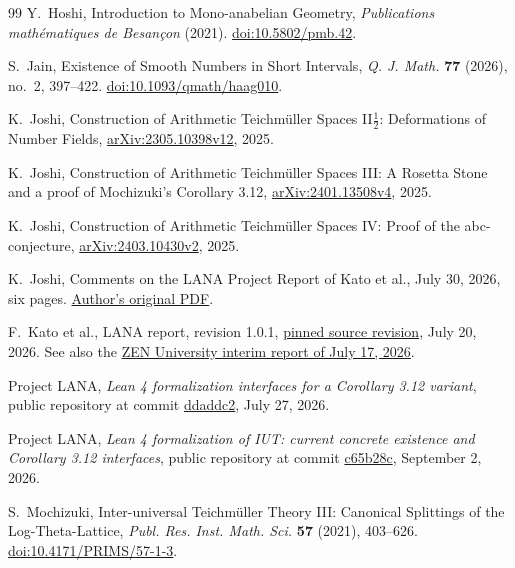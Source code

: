 \documentclass[11pt]{amsart}
\theoremstyle{definition}
\theoremstyle{remark}
\begin{document}
\begin{thebibliography}{99}
Y.~Hoshi, Introduction to Mono-anabelian Geometry,
\emph{Publications math\'ematiques de Besan\c con} (2021).
\href{https://doi.org/10.5802/pmb.42}{doi:10.5802/pmb.42}.

S.~Jain, Existence of Smooth Numbers in Short Intervals,
\emph{Q. J. Math.} \textbf{77} (2026), no.~2, 397--422.
\href{https://doi.org/10.1093/qmath/haag010}{doi:10.1093/qmath/haag010}.

K.~Joshi, Construction of Arithmetic Teichm\"uller Spaces II$\frac12$:
Deformations of Number Fields,
\href{https://arxiv.org/abs/2305.10398v12}{arXiv:2305.10398v12}, 2025.

K.~Joshi, Construction of Arithmetic Teichm\"uller Spaces III:
A Rosetta Stone and a proof of Mochizuki's Corollary 3.12,
\href{https://arxiv.org/abs/2401.13508v4}{arXiv:2401.13508v4}, 2025.

K.~Joshi, Construction of Arithmetic Teichm\"uller Spaces IV:
Proof of the abc-conjecture,
\href{https://arxiv.org/abs/2403.10430v2}{arXiv:2403.10430v2}, 2025.

K.~Joshi, Comments on the LANA Project Report of Kato et al.,
July 30, 2026, six pages.
\href{https://sites.arizona.edu/kirti-joshi/files/2026/07/Comments-on-the-LANA-Project-Report-of-Kato-et-al.pdf}{Author's original PDF}.

F.~Kato et al., LANA report, revision 1.0.1,
\href{https://github.com/katobungen/LANA_report_202607/tree/293bdd89463473ae13d40834d70fb4b7ba81da1f}{pinned source revision}, July 20, 2026.
See also the \href{https://zen.ac.jp/news/zmcpostevent0717e}{ZEN University
interim report of July 17, 2026}.

Project LANA,
\emph{Lean 4 formalization interfaces for a Corollary 3.12 variant},
public repository at commit
\href{https://github.com/lana-agents/iut/tree/ddaddc274281adb5674d647e24fa478745ac6d40}{ddaddc2},
July 27, 2026.

Project LANA,
\emph{Lean 4 formalization of IUT: current concrete existence and
Corollary 3.12 interfaces}, public repository at commit
\href{https://github.com/lana-agents/iut/tree/c65b28c9f9631635e742294c3a5df15759e7c74c}{c65b28c},
September 2, 2026.

S.~Mochizuki, Inter-universal Teichm\"uller Theory III:
Canonical Splittings of the Log-Theta-Lattice,
\emph{Publ. Res. Inst. Math. Sci.} \textbf{57} (2021), 403--626.
\href{https://doi.org/10.4171/PRIMS/57-1-3}{doi:10.4171/PRIMS/57-1-3}.


\end{thebibliography}
\end{document}
